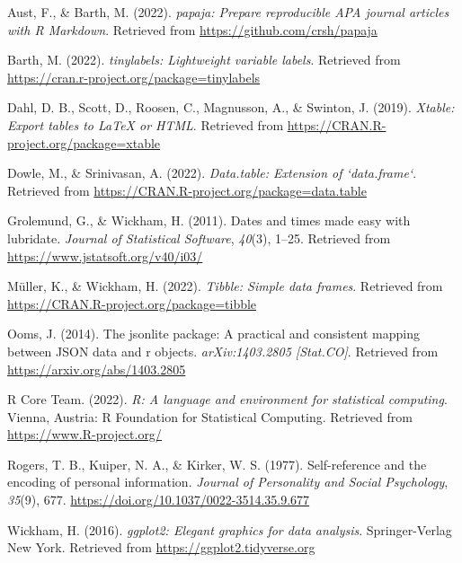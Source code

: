 \documentclass[
  man,floatsintext]{apa6}
\newlength{\cslhangindent}
\newlength{\cslentryspacingunit} %
\newenvironment{CSLReferences}[2] %
 {%
  \setlength{\parindent}{0pt}
  \ifodd #1
  \let\oldpar\par
  \def\par{\hangindent=\cslhangindent\oldpar}
  \fi
  \setlength{\parskip}{#2\cslentryspacingunit}
 }%
 {}
\begin{document}
\hypertarget{refs}{}
\begin{CSLReferences}{1}{0}
\leavevmode{}%
Aust, F., \& Barth, M. (2022). \emph{{papaja}: {Prepare} reproducible {APA} journal articles with {R Markdown}}. Retrieved from \url{https://github.com/crsh/papaja}

\leavevmode{}%
Barth, M. (2022). \emph{{tinylabels}: Lightweight variable labels}. Retrieved from \url{https://cran.r-project.org/package=tinylabels}

\leavevmode{}%
Dahl, D. B., Scott, D., Roosen, C., Magnusson, A., \& Swinton, J. (2019). \emph{Xtable: Export tables to LaTeX or HTML}. Retrieved from \url{https://CRAN.R-project.org/package=xtable}

\leavevmode{}%
Dowle, M., \& Srinivasan, A. (2022). \emph{Data.table: Extension of `data.frame`}. Retrieved from \url{https://CRAN.R-project.org/package=data.table}

\leavevmode{}%
Grolemund, G., \& Wickham, H. (2011). Dates and times made easy with {lubridate}. \emph{Journal of Statistical Software}, \emph{40}(3), 1--25. Retrieved from \url{https://www.jstatsoft.org/v40/i03/}

\leavevmode{}%
Müller, K., \& Wickham, H. (2022). \emph{Tibble: Simple data frames}. Retrieved from \url{https://CRAN.R-project.org/package=tibble}

\leavevmode{}%
Ooms, J. (2014). The jsonlite package: A practical and consistent mapping between JSON data and r objects. \emph{arXiv:1403.2805 {[}Stat.CO{]}}. Retrieved from \url{https://arxiv.org/abs/1403.2805}

\leavevmode{}%
R Core Team. (2022). \emph{R: A language and environment for statistical computing}. Vienna, Austria: R Foundation for Statistical Computing. Retrieved from \url{https://www.R-project.org/}

\leavevmode{}%
Rogers, T. B., Kuiper, N. A., \& Kirker, W. S. (1977). Self-reference and the encoding of personal information. \emph{Journal of Personality and Social Psychology}, \emph{35}(9), 677. \url{https://doi.org/10.1037/0022-3514.35.9.677}

\leavevmode{}%
Wickham, H. (2016). \emph{ggplot2: Elegant graphics for data analysis}. Springer-Verlag New York. Retrieved from \url{https://ggplot2.tidyverse.org}


\end{CSLReferences}
\end{document}
